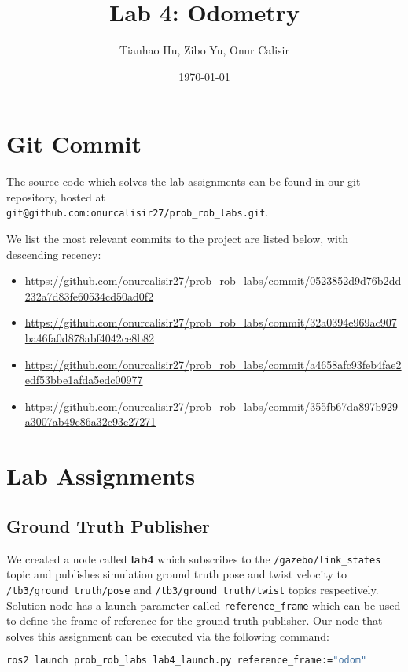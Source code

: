 \documentclass[14pt,letterpaper]{article}
\title{Lab 4: Odometry}
\author{Tianhao Hu, Zibo Yu, Onur Calisir}
\date{\today}
\begin{document}
\maketitle
\section{Git Commit}

The source code which solves the lab assignments can be found in our git repository, hosted at \\
\texttt{git@github.com:onurcalisir27/prob\_rob\_labs.git}.

We list the most relevant commits to the project are listed below, with descending recency:
\begin{itemize}
  \item \url{https://github.com/onurcalisir27/prob_rob_labs/commit/0523852d9d76b2dd232a7d83fe60534cd50ad0f2}
  \item \url{https://github.com/onurcalisir27/prob_rob_labs/commit/32a0394e969ac907ba46fa0d878abf4042ce8b82}
  \item \url{https://github.com/onurcalisir27/prob_rob_labs/commit/a4658afc93feb4fae2edf53bbe1afda5edc00977}
  \item \url{https://github.com/onurcalisir27/prob_rob_labs/commit/355fb67da897b929a3007ab49c86a32c93e27271}
\end{itemize}
\section{Lab Assignments}

\subsection{Ground Truth Publisher}

We created a node called \textbf{lab4} which subscribes to the \texttt{/gazebo/link\_states} topic and publishes simulation ground truth pose and twist velocity to
\texttt{/tb3/ground\_truth/pose} and \texttt{/tb3/ground\_truth/twist} topics respectively.
Solution node has a launch parameter called \texttt{reference\_frame} which can be used to define the frame of reference for the ground truth publisher.
Our node that solves this assignment can be executed via the following command:
\begin{lstlisting}[language=bash]
ros2 launch prob_rob_labs lab4_launch.py reference_frame:="odom"
\end{lstlisting}
\end{document}

